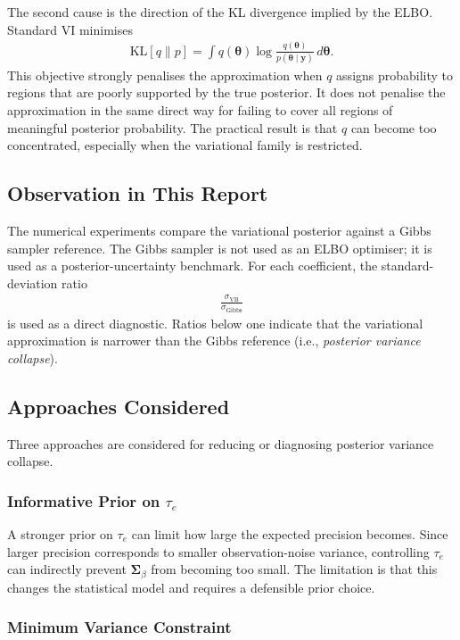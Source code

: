 \documentclass[11pt,a4paper]{article}
\begin{document}
The second cause is the direction of the KL divergence implied by the ELBO. Standard VI minimises
\begin{align}
\mathrm{KL}[q\|p] = \int q(\bm{\theta})\log\frac{q(\bm{\theta})}{p(\bm{\theta}\mid\bm{y})}\,d\bm{\theta}.
\end{align}
This objective strongly penalises the approximation when $q$ assigns probability to regions that are poorly supported by the true posterior. It does not penalise the approximation in the same direct way for failing to cover all regions of meaningful posterior probability. The practical result is that $q$ can become too concentrated, especially when the variational family is restricted.

\subsection{Observation in This Report}

The numerical experiments compare the variational posterior against a Gibbs sampler reference. The Gibbs sampler is not used as an ELBO optimiser; it is used as a posterior-uncertainty benchmark. For each coefficient, the standard-deviation ratio
\begin{align}
\frac{\sigma_{\mathrm{VB}}}{\sigma_{\mathrm{Gibbs}}}
\end{align}
is used as a direct diagnostic. Ratios below one indicate that the variational approximation is narrower than the Gibbs reference (i.e., \emph{posterior variance collapse}).

\subsection{Approaches Considered}

Three approaches are considered for reducing or diagnosing posterior variance collapse.

\subsubsection{Informative Prior on $\tau_e$}

A stronger prior on $\tau_e$ can limit how large the expected precision becomes. Since larger precision corresponds to smaller observation-noise variance, controlling $\tau_e$ can indirectly prevent $\bm{\Sigma}_\beta$ from becoming too small. The limitation is that this changes the statistical model and requires a defensible prior choice.

\subsubsection{Minimum Variance Constraint}
\end{document}
